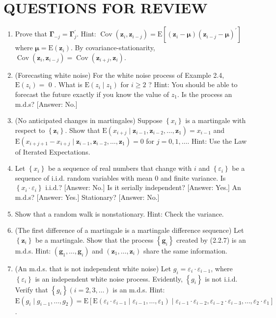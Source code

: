 \documentclass[10pt]{article}
\begin{document}
\section*{QUESTIONS FOR REVIEW}
\begin{enumerate}
  \item Prove that $\boldsymbol{\Gamma}_{-j}=\boldsymbol{\Gamma}_{j}^{\prime}$. Hint: $\operatorname{Cov}\left(\mathbf{z}_{i}, \mathbf{z}_{i-j}\right)=\mathrm{E}\left[\left(\mathbf{z}_{i}-\boldsymbol{\mu}\right)\left(\mathbf{z}_{i-j}-\boldsymbol{\mu}\right)^{\prime}\right]$ where $\boldsymbol{\mu}=\mathrm{E}\left(\mathbf{z}_{i}\right)$. By covariance-stationarity, $\operatorname{Cov}\left(\mathbf{z}_{i}, \mathbf{z}_{i-j}\right)=\operatorname{Cov}\left(\mathbf{z}_{i+j}, \mathbf{z}_{i}\right)$.
  \item (Forecasting white noise) For the white noise process of Example 2.4, $\mathrm{E}\left(z_{i}\right)=$ 0 . What is $\mathrm{E}\left(z_{i} \mid z_{1}\right)$ for $i \geq 2$ ? Hint: You should be able to forecast the future exactly if you know the value of $z_{1}$. Is the process an m.d.s? [Answer: No.]
  \item (No anticipated changes in martingales) Suppose $\left\{x_{i}\right\}$ is a martingale with respect to $\left\{\mathbf{z}_{i}\right\}$. Show that $\mathrm{E}\left(x_{i+j} \mid \mathbf{z}_{i-1}, \mathbf{z}_{i-2}, \ldots, \mathbf{z}_{1}\right)=x_{i-1}$ and $\mathrm{E}\left(x_{i+j+1}-\right. \left.x_{i+j} \mid \mathbf{z}_{i-1}, \mathbf{z}_{i-2}, \ldots, \mathbf{z}_{1}\right)=0$ for $j=0,1, \ldots$. Hint: Use the Law of Iterated Expectations.
  \item Let $\left\{x_{i}\right\}$ be a sequence of real numbers that change with $i$ and $\left\{\varepsilon_{i}\right\}$ be a sequence of i.i.d. random variables with mean 0 and finite variance. Is $\left\{x_{i} \cdot \varepsilon_{i}\right\}$ i.i.d.? [Answer: No.] Is it serially independent? [Answer: Yes.] An m.d.s? [Answer: Yes.] Stationary? [Answer: No.]
  \item Show that a random walk is nonstationary. Hint: Check the variance.
  \item (The first difference of a martingale is a martingale difference sequence) Let $\left\{\mathbf{z}_{i}\right\}$ be a martingale. Show that the process $\left\{\mathbf{g}_{i}\right\}$ created by (2.2.7) is an m.d.s. Hint: $\left(\mathbf{g}_{1}, \ldots, \mathbf{g}_{i}\right)$ and $\left(\mathbf{z}_{1}, \ldots, \mathbf{z}_{i}\right)$ share the same information.
  \item (An m.d.s. that is not independent white noise) Let $g_{i}=\varepsilon_{i} \cdot \varepsilon_{i-1}$, where $\left\{\varepsilon_{i}\right\}$ is an independent white noise process. Evidently, $\left\{g_{i}\right\}$ is not i.i.d. Verify that $\left\{g_{i}\right\}(i=2,3, \ldots)$ is an m.d.s. Hint: $\mathrm{E}\left(g_{i} \mid g_{i-1}, \ldots, g_{2}\right)=\mathrm{E}\left[\mathrm{E}\left(\varepsilon_{i} \cdot \varepsilon_{i-1} \mid\right.\right. \left.\left.\varepsilon_{i-1}, \ldots, \varepsilon_{1}\right) \mid \varepsilon_{i-1} \cdot \varepsilon_{i-2}, \varepsilon_{i-2} \cdot \varepsilon_{i-3}, \ldots, \varepsilon_{2} \cdot \varepsilon_{1}\right]$.

\end{enumerate}
\end{document}
